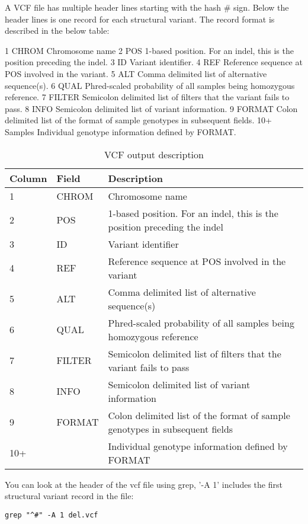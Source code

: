 \begin{information}
A VCF file has multiple header lines starting with the hash \# sign. Below the header lines is one record for each structural variant. The record format is described in the below table:

1	CHROM	Chromosome name
2 	POS 		1-based position. For an indel, this is the position preceding the indel.
3 	ID 		Variant identifier. 
4	REF		Reference sequence at POS involved in the variant. 
5	ALT		Comma delimited list of alternative sequence(s).
6	QUAL		Phred-scaled probability of all samples being homozygous reference.
7	FILTER	Semicolon delimited list of filters that the variant fails to pass.
8	INFO		Semicolon delimited list of variant information.
9	FORMAT	Colon delimited list of the format of sample genotypes in subsequent fields.
10+ 	Samples	Individual genotype information defined by FORMAT.

\begin{table}[H]
  \centering
  \caption{VCF output description}
    \begin{tabular}{lll}
    \toprule
    Column & Field & Description \\
    \midrule
    1 & CHROM & Chromosome name \\
    2 & POS & 1-based position. For an indel, this is the position preceding the indel \\
    3 & ID & Variant identifier \\
    4 & REF & Reference sequence at POS involved in the variant \\
    5 & ALT & Comma delimited list of alternative sequence(s) \\
    6 & QUAL & Phred-scaled probability of all samples being homozygous reference \\
    7 & FILTER & Semicolon delimited list of filters that the variant fails to pass \\
    8 & INFO & Semicolon delimited list of variant information \\
    9 & FORMAT & Colon delimited list of the format of sample genotypes in subsequent fields \\
    10+ & & Individual genotype information defined by FORMAT \\
    \bottomrule
    \end{tabular}
  \label{tab:vcfoutput}
\end{table}


\end{information}
\begin{steps}
You can look at the header of the vcf file using grep, '-A 1' includes the first structural variant record in the file:

\begin{lstlisting}
grep "^#" -A 1 del.vcf
\end{lstlisting}
\end{steps}

